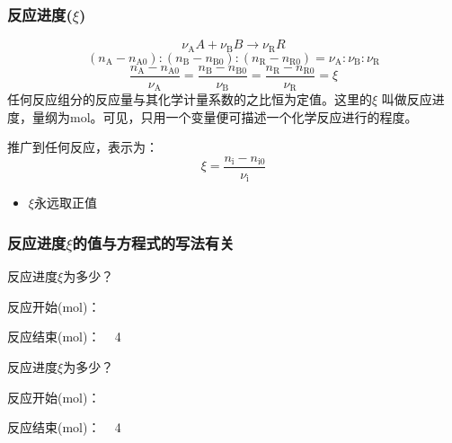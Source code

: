 \documentclass[dvipsnames, svgnames, x11names]{beamer}
\begin{document}
\begin{frame}
    \frametitle{反应进度($\xi$)}
    \[
        {\nu_\mathrm{A}}{A}+{\nu_\mathrm{B}}{B}\to{\nu_\mathrm{R}}{R}
    \]
    \[
        (n_{\mathrm{A}}-n_{\mathrm{A0}}):(n_{\mathrm{B}}-n_{\mathrm{B0}}):(n_{\mathrm{R}}-n_{\mathrm{R0}})=\nu_{\mathrm{A}}:\nu_{\mathrm{B}}:\nu_{\mathrm{R}}
    \]
    \[
        \frac{n_{\mathrm{A}}-n_\mathrm{A0}}{\nu_{\mathrm{A}}}=\frac{n_{\mathrm{B}}-n_\mathrm{B0}}{\nu_{\mathrm{B}}}=\frac{n_{\mathrm{R}}-n_\mathrm{R0}}{\nu_{\mathrm{R}}}=\xi 
    \]
    任何反应组分的反应量与其化学计量系数的之比恒为定值。这里的$\xi$ 叫做反应进度，量纲为mol。可见，只用一个变量便可描述一个化学反应进行的程度。

    推广到任何反应，表示为：
    \[
        \xi=\frac{n_\mathrm{i}-n_\mathrm{i0}}{\nu_\mathrm{i}}
    \]
    \begin{itemize}
      \item $\xi$永远取正值
    \end{itemize}
\end{frame}


\begin{frame}[t]
    \frametitle{反应进度$\xi$的值与方程式的写法有关}
    \begin{block}{反应进度$\xi$为多少？}
        \begin{center}
    
        反应开始(mol)：    \qquad  {} \qquad  \qquad \qquad  \qquad  \qquad  \qquad
    
        反应结束(mol)：   \quad ~  4  \qquad  {} \qquad \qquad \qquad  \qquad  \qquad  \qquad  \qquad
        \end{center}
    \end{block}
    \begin{block}{反应进度$\xi$为多少？}
        \begin{center}
    
        反应开始(mol)：    \quad  {} \qquad  \qquad \qquad  \qquad  \qquad  \qquad
    
        反应结束(mol)：   \qquad ~  4  \quad  {} \qquad \qquad \qquad  \qquad  \qquad  \qquad  \qquad
        \end{center}
    \end{block}
\end{frame}
\end{document}
